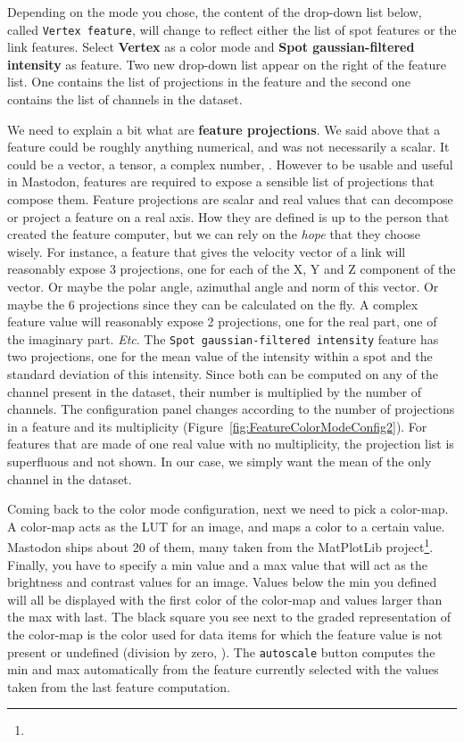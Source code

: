\noindent Depending on the mode you chose, the content of the drop-down list below, called \texttt{Vertex feature}, will change to reflect either the list of spot features or the link features.
Select \textbf{Vertex} as a color mode and \textbf{Spot gaussian-filtered intensity} as feature.
Two new drop-down list appear on the right of the feature list. 
One contains the list of projections in the feature and the second one contains the list of channels in the dataset. 

We need to explain a bit what are \textbf{feature projections}.
We said above that a feature could be roughly anything numerical, and was not necessarily a scalar. 
It could be a vector, a tensor, a complex number, \etc.
However to be usable and useful in Mastodon, features are required to expose a sensible list of projections that compose them.
Feature projections are scalar and real values that can decompose or project a feature on a real axis.
How they are defined is up to the person that created the feature computer, but we can rely on the \textit{hope} that they choose wisely. 
For instance, a feature that gives the velocity vector of a link will reasonably expose 3 projections, one for each of the X, Y and Z component of the vector. 
Or maybe the polar angle, azimuthal angle and norm of this vector.
Or maybe the 6 projections since they can be calculated on the fly. 
A complex feature value will reasonably expose 2 projections, one for the real part, one of the imaginary part.
\textit{Etc}.
The \texttt{Spot gaussian-filtered intensity} feature has two projections, one for the mean value of the intensity within a spot and the standard deviation of this intensity.
Since both can be computed on any of the channel present in the dataset, their number is multiplied by the number of channels. 
The configuration panel changes according to the number of projections in a feature and its multiplicity (Figure~\ref{fig:FeatureColorModeConfig2}). 
For features that are made of one real value with no multiplicity, the projection list is superfluous and not shown.
In our case, we simply want the mean of the only channel in the dataset.

Coming back to the color mode configuration, next we need to pick a color-map.
A color-map acts as the LUT for an image, and maps a color to a certain value. 
Mastodon ships about 20 of them, many taken from the MatPlotLib project\footnote{}.
Finally, you have to specify a min value and a max value that will act as the brightness and contrast values for an image.
Values below the min you defined will all be displayed with the first color of the color-map and values larger than the max with last.
The black square you see next to the graded representation of the color-map is the color used for data items for which the feature value is not present or undefined (division by zero, \etc).
The \texttt{autoscale} button computes the min and max automatically from the feature currently selected with the values taken from the last feature computation.

